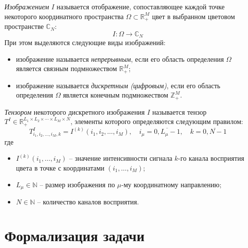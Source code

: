 \textit{Изображением} $I$ называется отображение, сопоставляющее каждой точке некоторого координатного пространства $\Omega \subset \mathbb{R}^M_+$ цвет в выбранном цветовом пространстве $\mathbb{C}_N$:
\begin{equation}
	I: \Omega \rightarrow \mathbb{C}_N
\end{equation}
При этом выделяются следующие виды изображений:
\begin{itemize}
	\item изображение называется \textit{непрерывным}, если его область определения $\Omega$ является связным подмножеством $\mathbb{R}^M_+$;
	\item изображение называется \textit{дискретным (цифровым)}, если его область определения $\Omega$ является конечным подмножеством $\mathbb{Z}^M_+$.
\end{itemize}

\textit{Тензором} некоторого дискретного изображения $I$ называется тензор $T^I \in \mathbb{R}^{L_1 \times L_2 \times \cdots \times L_M \times N}_+$, элементы которого определяются следующим правилом:
\begin{equation}
	T^I_{i_1, i_2, \ldots, i_M, k} = I^{(k)}(i_1, i_2, \ldots, i_M), \quad i_\mu = \overline{0, L_\mu-1}, \quad k = \overline{0, N-1}
\end{equation}
где
\begin{itemize}
	\item $I^{(k)}(i_1,\ldots,i_M)$ -- значение интенсивности сигнала $k$-го канала восприятия цвета в точке с координатами $(i_1,\ldots,i_M)$;
	\item $L_\mu \in \mathbb{N}$ -- размер изображения по $\mu$-му координатному направлению;
	\item $N \in \mathbb{N}$ -- количество каналов восприятия.
\end{itemize}

\section{Формализация задачи}
\label{sec:task-formalization}


